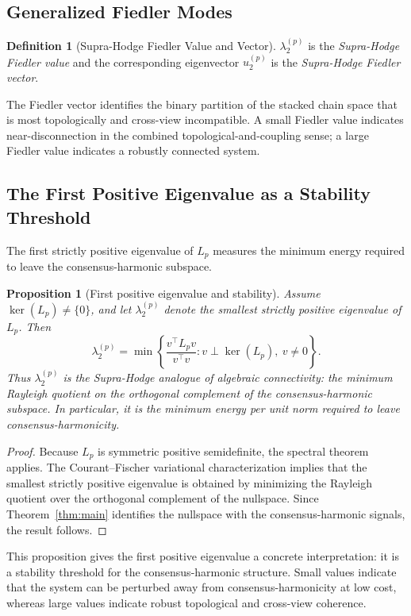 \documentclass[11pt]{article}
\newtheorem{proposition}[theorem]{Proposition}
\theoremstyle{definition}
\newtheorem{definition}[theorem]{Definition}
\theoremstyle{remark}
\begin{document}
\subsection{Generalized Fiedler Modes}

\begin{definition}[Supra-Hodge Fiedler Value and Vector]
$\lambda_2^{(p)}$ is the \emph{Supra-Hodge Fiedler value} and the
corresponding eigenvector $u_2^{(p)}$ is the \emph{Supra-Hodge Fiedler vector}.
\end{definition}

The Fiedler vector identifies the binary partition of the stacked chain space
that is most topologically and cross-view incompatible. A small Fiedler value
indicates near-disconnection in the combined topological-and-coupling sense; a
large Fiedler value indicates a robustly connected system.

\subsection{The First Positive Eigenvalue as a Stability Threshold}

The first strictly positive eigenvalue of $L_p$ measures the minimum energy required to leave the consensus-harmonic subspace.

\begin{proposition}[First positive eigenvalue and stability]
Assume $\ker(L_p)\neq \{0\}$, and let $\lambda_2^{(p)}$ denote the smallest strictly positive eigenvalue of $L_p$. Then
\[
\lambda_2^{(p)}
=
\min \left\{
\frac{v^\top L_p v}{v^\top v}
:
v \perp \ker(L_p),\ v\neq 0
\right\}.
\]
Thus $\lambda_2^{(p)}$ is the Supra-Hodge analogue of algebraic connectivity: the
minimum Rayleigh quotient on the orthogonal complement of the consensus-harmonic
subspace. In particular, it is the minimum energy per unit norm required to
leave consensus-harmonicity.
\end{proposition}

\begin{proof}
Because $L_p$ is symmetric positive semidefinite, the spectral theorem applies. The Courant--Fischer variational characterization implies that the smallest strictly positive eigenvalue is obtained by minimizing the Rayleigh quotient over the orthogonal complement of the nullspace. Since Theorem~\ref{thm:main} identifies the nullspace with the consensus-harmonic signals, the result follows.
\end{proof}

This proposition gives the first positive eigenvalue a concrete interpretation: it is a stability threshold for the consensus-harmonic structure. Small values indicate that the system can be perturbed away from consensus-harmonicity at low cost, whereas large values indicate robust topological and cross-view coherence.
\end{document}
